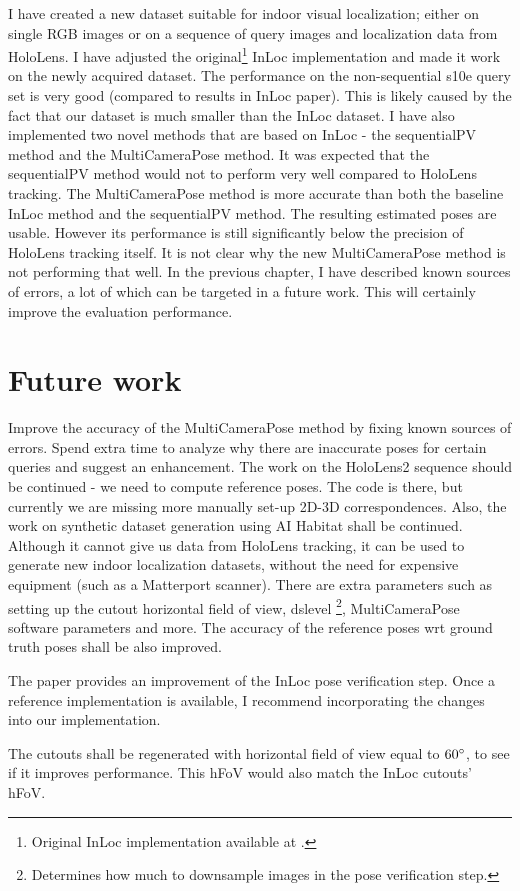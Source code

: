 \documentclass[twoside]{ctuthesis}
\theoremstyle{plain}
\theoremstyle{definition}
\theoremstyle{note}
\newcommand{\code}[1]{{\ttfamily #1%
}}
\begin{document}
I have created a new dataset suitable for indoor visual localization; either on single RGB images or on a sequence of query images and localization data from HoloLens. I have adjusted the original\footnote{Original InLoc implementation available at \cite{InLocImplementation}.} InLoc implementation and made it work on the newly acquired dataset. The performance on the non-sequential s10e query set is very good (compared to results in InLoc paper). This is likely caused by the fact that our dataset is much smaller than the InLoc dataset. I have also implemented two novel methods that are based on InLoc \cite{taira2018inloc} - the sequentialPV method and the MultiCameraPose method. It was expected that the sequentialPV method would not to perform very well compared to HoloLens tracking. The MultiCameraPose method is more accurate than both the baseline InLoc method and the sequentialPV method. The resulting estimated poses are usable. However its performance is still significantly below the precision of HoloLens tracking itself. It is not clear why the new MultiCameraPose method is not performing that well. In the previous chapter, I have described known sources of errors, a lot of which can be targeted in a future work. This will certainly improve the evaluation performance.

\section{Future work}
Improve the accuracy of the MultiCameraPose method by fixing known sources of errors. Spend extra time to analyze why there are inaccurate poses for certain queries and suggest an enhancement. The work on the HoloLens2 sequence should be continued - we need to compute reference poses. The code is there, but currently we are missing more manually set-up 2D-3D correspondences. Also, the work on synthetic dataset generation using AI Habitat shall be continued. Although it cannot give us data from HoloLens tracking, it can be used to generate new indoor localization datasets, without the need for expensive equipment (such as a Matterport scanner). There are extra parameters such as setting up the cutout horizontal field of view, \code{dslevel}\footnote{Determines how much to downsample images in the pose verification step.}, \code{MultiCameraPose} software \cite{MultiCameraPose} parameters and more. The accuracy of the reference poses wrt ground truth poses shall be also improved.

The paper \cite{IsThisTheRightPlace} provides an improvement of the InLoc pose verification step. Once a reference implementation is available, I recommend incorporating the changes into our implementation.

The cutouts shall be regenerated with horizontal field of view equal to $60\degree$, to see if it improves performance. This hFoV would also match the InLoc cutouts' hFoV.

\appendix

\printindex

\appendix

%


\end{document}
